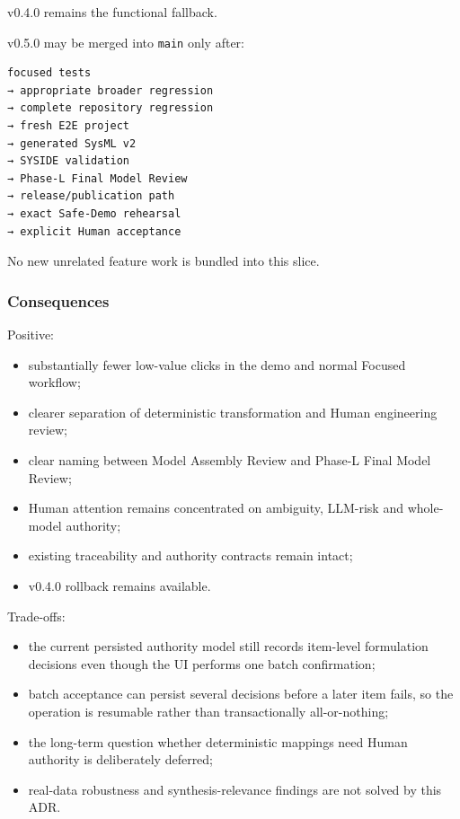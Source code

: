 v0.4.0 remains the functional fallback.

v0.5.0 may be merged into \texttt{main} only after:

\begin{verbatim}
focused tests
→ appropriate broader regression
→ complete repository regression
→ fresh E2E project
→ generated SysML v2
→ SYSIDE validation
→ Phase-L Final Model Review
→ release/publication path
→ exact Safe-Demo rehearsal
→ explicit Human acceptance
\end{verbatim}

No new unrelated feature work is bundled into this slice.

\hypertarget{consequences-18}{%
\subsubsection{Consequences}\label{consequences-18}}

Positive:

\begin{itemize}
\tightlist
\item
  substantially fewer low-value clicks in the demo and normal Focused workflow;
\item
  clearer separation of deterministic transformation and Human engineering review;
\item
  clear naming between Model Assembly Review and Phase-L Final Model Review;
\item
  Human attention remains concentrated on ambiguity, LLM-risk and whole-model authority;
\item
  existing traceability and authority contracts remain intact;
\item
  v0.4.0 rollback remains available.
\end{itemize}

Trade-offs:

\begin{itemize}
\tightlist
\item
  the current persisted authority model still records item-level formulation decisions even though the UI performs one batch confirmation;
\item
  batch acceptance can persist several decisions before a later item fails, so the operation is resumable rather than transactionally all-or-nothing;
\item
  the long-term question whether deterministic mappings need Human authority is deliberately deferred;
\item
  real-data robustness and synthesis-relevance findings are not solved by this ADR.
\end{itemize}
